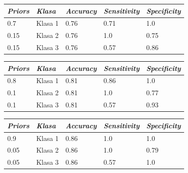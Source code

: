 \documentclass[12pt,a4paper]{article}
\begin{document}
\begin{table}[H]
\centering
\begin{tabular}{|l|l|l|l|l|}
\hline
\textbf{\textit{Priors}} 	& \textbf{\textit{Klasa}}   	& \textbf{\textit{Accuracy}} 	& \textbf{\textit{Sensitivity}} 	& \textbf{\textit{Specificity}} 		\\ \hline
0.7             				& Klasa 1 				& 0.76              					& 0.71                 					& 1.0                  	\\ \hline
0.15            				& Klasa 2 				& 0.76              					& 1.0                  					& 0.75              		\\ \hline
0.15            				& Klasa 3 				& 0.76              					& 0.57                 					& 0.86               		\\ \hline
\end{tabular}
\end{table}

\begin{table}[H]
\centering
\begin{tabular}{|l|l|l|l|l|}
\hline
\textbf{\textit{Priors}} 	  & \textbf{\textit{Klasa}}   		& \textbf{\textit{Accuracy}} 		& \textbf{\textit{Sensitivity}} 			& \textbf{\textit{Specificity}} 		\\ \hline
0.8             				  & Klasa 1 						& 0.81              					& 0.86                 					& 1.0                  				\\ \hline
0.1             				  & Klasa 2 						& 0.81              					& 1.0                  					& 0.77                 				\\ \hline
0.1             				  & Klasa 3 						& 0.81              					& 0.57                 					& 0.93                 				\\ \hline
\end{tabular}
\end{table}

\begin{table}[H]
\centering
\begin{tabular}{|l|l|l|l|l|}
\hline
\textbf{\textit{Priors}} 	& \textbf{\textit{Klasa}}   	& \textbf{\textit{Accuracy}} 		& \textbf{\textit{Sensitivity}} 			& \textbf{\textit{Specificity}} 		\\ \hline
0.9             				& Klasa 1 				& 0.86              					& 1.0                  					& 1.0                  				\\ \hline
0.05            				& Klasa 2 				& 0.86              					& 1.0                  					& 0.79                 				\\ \hline
0.05            				& Klasa 3 				& 0.86              					& 0.57                 					& 1.0                  				\\ \hline
\end{tabular}
\end{table}
\end{document}
